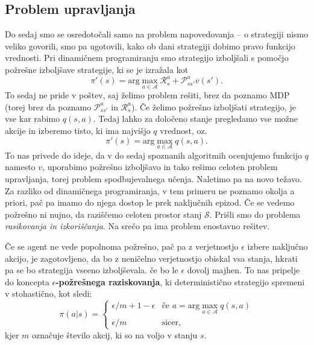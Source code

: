\documentclass[12pt,a4paper]{amsart}
\theoremstyle{definition} %
\theoremstyle{plain} %
\begin{document}
\subsection{Problem upravljanja}
Do sedaj smo se osredotočali samo na problem napovedovanja -- o strategiji nismo veliko govorili, 
smo pa ugotovili, kako ob dani strategiji dobimo pravo funkcijo vrednosti. Pri dinamičnem 
programiranju smo strategijo izboljšali s pomočjo požrešne izboljšave strategije, ki se je izražala kot
$$
\pi'(s) = \text{arg}\max_{a \in \mathcal{A}} \mathcal{R}_s^a + \mathcal{P}_{ss'}^a v(s').
$$
To sedaj ne pride v poštev, saj želimo problem rešiti, brez da poznamo MDP (torej brez da poznamo 
$\mathcal{P}_{ss'}^a$ in $\mathcal{R}_s^a$). Če želimo požrešno izboljšati strategijo, je vse kar 
rabimo $q(s, a)$. Tedaj lahko za določeno stanje pregledamo vse možne akcije in izberemo tisto, 
ki ima najvišjo $q$ vrednost, oz.
\begin{equation}\label{PIS}
    \pi'(s) = \text{arg}\max_{a \in \mathcal{A}} q(s, a).
\end{equation}
To nas privede do ideje, da v do sedaj spoznanih algoritmih ocenjujemo funkcijo $q$ namesto $v$, 
uporabimo požrešno izboljšavo in tako rešimo celoten problem upravljanja, torej problem spodbujevalnega
učenja. Naletimo pa na novo težavo. Za razliko od dinamičnega programiranja, v tem primeru ne poznamo 
okolja a priori, pač pa imamo do njega dostop le prek naključnih epizod. Če se vedemo požrešno ni nujno, 
da raziščemo celoten prostor stanj $\mathcal{S}$. Prišli smo do problema \textit{rasikovanja in 
izkoriščanja}. Na srečo pa ima problem enostavno rešitev.

Če se agent ne vede popolnoma požrešno, pač pa z verjetnostjo $\epsilon$ izbere naključno akcijo, 
je zagotovljeno, da bo z neničelno verjetnostjo obiskal vsa stanja, hkrati pa se bo strategija 
vseeno izboljševala. če bo le $\epsilon$ dovolj majhen. To nas pripelje do koncepta \textbf{
$\epsilon$-požrešnega raziskovanja}, ki deterministično strategijo spremeni v stohastično, kot
sledi:
\begin{equation}
    \pi(a|s) = \begin{cases}
                \epsilon / m + 1 - \epsilon & \text{če } a = \text{arg}\max_{a \in 
                    \mathcal{A}} q(s, a) \\
                    \epsilon / m & \text{sicer},
               \end{cases}
\end{equation}
kjer $m$ označuje število akcij, ki so na voljo v stanju $s$.
\end{document}
